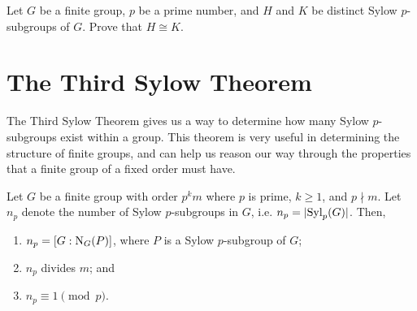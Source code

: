 \begin{exercise}
    Let $G$ be a finite group, $p$ be a prime number, and $H$ and $K$ be distinct Sylow $p$-subgroups of $G$. Prove that $H \cong K$.
\end{exercise}

\section{The Third Sylow Theorem}
The Third Sylow Theorem gives us a way to determine how many Sylow $p$-subgroups exist within a group. This theorem is very useful in determining the structure of finite groups, and can help us reason our way through the properties that a finite group of a fixed order must have.

\begin{theorem}\label{thrm-sylow-3}
    Let $G$ be a finite group with order $p^k m$ where $p$ is prime, $k \geq 1$, and $p \nmid m$. Let $n_p$ denote the number of Sylow $p$-subgroups in $G$, i.e. $n_p = |\mathrm{Syl}_{p}(G)|$. Then,
    \begin{enumerate}
        \item $n_p = [G:\mathrm{N}_{G}(P)]$, where $P$ is a Sylow $p$-subgroup of $G$;
        \item $n_p$ divides $m$; and
        \item $n_p \equiv 1 \pmod p$.
    \end{enumerate}
\end{theorem}

